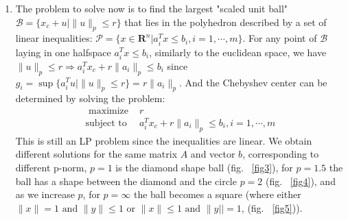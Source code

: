 \documentclass[10pt]{article}
\newcommand{\0}{\mat{0}}
\begin{document}
\begin{enumerate}
\begin{enumerate}
\item The problem to solve now is to find the largest "scaled unit ball" $\mathcal{B} = \{x_c + u | \| u \|_p \le r \}$ that lies in the polyhedron described by a set of linear inequalities:
$\mathcal{P} = \{x \in \mathbf{R}^n | a_i^T x \le b_i, i=1, \cdots, m \}$. For any point of $\mathcal{B}$ laying in one halfspace $a_i^T x \le b_i$, similarly to the euclidean space, 
we have $\| u \|_p \le r \Rightarrow a_i^T x_c +  r \| a_i \|_p  \le b_i$ since $g_i = \sup{\{a_i^T u | \| u \|_p \le r \}} = r \|a_i\|_p$. And the Chebyshev center can be determined by solving the problem:
\begin{align*}
	\text{ maximize } &  r\\
	\text{subject to }  & a_i^T x_c +  r \| a_i \|_p  \le b_i,  i=1, \cdots, m
\end{align*}
This is still an LP problem since the inequalities are linear.
We obtain different solutions for the same matrix $A$ and vector $b$, corresponding to different p-norm, $p=1$ is the diamond shape ball (fig.  ~\ref{fig3}),
for $p=1.5$  the ball has a shape between the diamond and the circle $p=2$ (fig. ~\ref{fig4}), and as we increase $p$, for $p=\infty$ the ball becomes a square 
(where either $\|x\| =1 \text{ and } \| y \| \le 1 \text{ or } \| x \| \le 1 \text{ and } \| y || = 1$,  (fig. ~\ref{fig5})).


\end{enumerate}
\end{enumerate}
\end{document}
